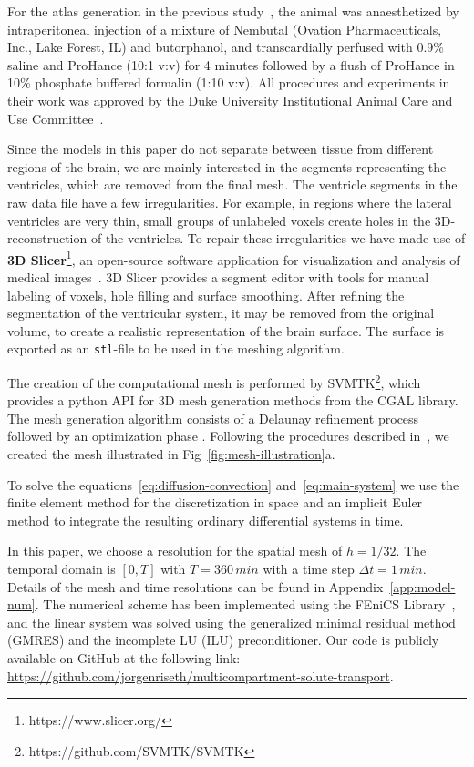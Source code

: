 \documentclass[10pt]{article}
\newcommand{\1}{^{(1)}}
\newcommand{\2}{^{(2)}}
\newcommand {\dt}   {\Delta t}
\begin{document}
For the atlas generation in the previous study~\cite{papp2014}, the animal was anaesthetized by intraperitoneal injection of a mixture of Nembutal (Ovation Pharmaceuticals, Inc., Lake Forest, IL) and butorphanol, and transcardially perfused with 0.9\% saline and ProHance (10:1 v:v) for 4 minutes followed by a flush of ProHance in 10\% phosphate buffered formalin (1:10 v:v). All procedures and experiments in their work was approved by the Duke University Institutional Animal Care and Use Committee~\cite{papp2014}.

Since the models in this paper do not separate between tissue from different regions of the brain, we are mainly interested in the segments representing the ventricles, which are removed from the final mesh. The ventricle segments in the raw data file have a few irregularities. For example, in regions where the lateral ventricles are very thin, small groups of unlabeled voxels create holes in the 3D-reconstruction of the ventricles. To repair these irregularities we have made use of \textbf{3D Slicer}\footnote{https://www.slicer.org/}, an open-source software application for visualization and analysis of medical images~\cite{fedorov2012}. 3D Slicer provides a segment editor with tools for manual labeling of voxels, hole filling and surface smoothing. After refining the segmentation of the ventricular system, it may be removed from the original volume, to create a realistic representation of the brain surface. The surface is exported as an \texttt{stl}-file to be used in the meshing algorithm.  

The creation of the computational mesh is performed by SVMTK\footnote{https://github.com/SVMTK/SVMTK}, which provides a python API for 3D mesh generation methods from the CGAL library. The mesh generation algorithm consists of a Delaunay refinement process followed by an optimization phase \cite{cgal:rty-m3-22a}. Following the procedures described in~\cite{Mardal-2022-mri}, we created the mesh illustrated in Fig~\ref{fig:mesh-illustration}a.

To solve the equations~\eqref{eq:diffusion-convection} and~\eqref{eq:main-system} we use the finite element method for the discretization in space and an implicit Euler method to integrate the resulting ordinary differential systems in time. 

In this paper, we choose a resolution for the spatial mesh of $h=1/32$. The temporal domain is $[0,T]$ with $T=360 \, \si{min}$ with a time step $\dt = 1 \, \si{min}$. Details of the mesh and time resolutions can be found in Appendix~\ref{app:model-num}. The numerical scheme has been implemented using the FEniCS Library~\cite{alnaes2015fenics,LoggMardalEtAl2012}, and the linear system was solved using the generalized minimal residual method (GMRES) and the incomplete LU (ILU) preconditioner. Our code is publicly available on GitHub at the following link: \url{https://github.com/jorgenriseth/multicompartment-solute-transport}.
\end{document}
